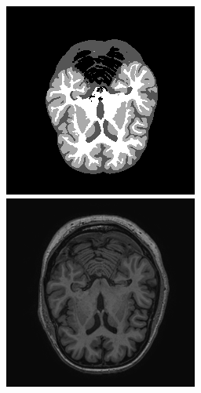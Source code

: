 \documentclass[runningheads,a4paper]{llncs}
\begin{document}
\begin{figure}
  \vspace{0.3em}
   \begin{minipage}{.24\textwidth}
 \includegraphics[width=.99\linewidth]{./images/sl19-v15-test-challres_new.png}
 \end{minipage}
  \begin{minipage}{.24\textwidth}
 \includegraphics[width=.99\linewidth]{./images/sl19-v15-test-t1.png}

\end{minipage}
\end{figure}
\end{document}
